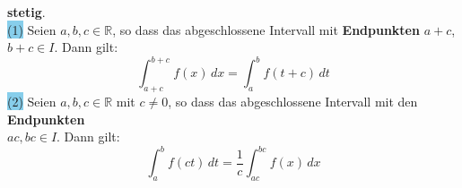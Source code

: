 \documentclass[landscape, 10pt]{article}
\newcommand{\R}{\mathbb{R}}
\begin{document}
\begin{multicols}{3}
                     \textbf{stetig}. \\
                     \colorbox{SkyBlue}{(1)} Seien 
                            \textcolor{NavyBlue}{$a,b,c\in\R$}, 
                            so dass das abgeschlossene Intervall 
                            mit \textbf{Endpunkten} 
                            \textcolor{NavyBlue}{$a+c$},
                            \textcolor{NavyBlue}{$b+c\in I$}. 
                            Dann gilt: 
                            \begin{equation*}
                                   \int_{a+c}^{b+c}f(x)\,dx
                                   =\int_a^bf(t+c)\,dt
                            \end{equation*}
                     \colorbox{SkyBlue}{(2)} 
                            Seien \textcolor{NavyBlue}{
                            $a,b,c\in\R$} mit 
                            \textcolor{NavyBlue}{$c\neq0$}, 
                            so dass das abgeschlossene 
                            Intervall mit den 
                            \textbf{Endpunkten} \\
                            \textcolor{NavyBlue}{$ac,bc\in I$}. 
                            Dann gilt: 
                            \begin{equation*}
                                   \int_a^bf(ct)\,dt
                                   =\frac{1}{c}
                                   \int_{ac}^{bc}f(x)\,dx
                            \end{equation*}

\end{multicols}
\end{document}
